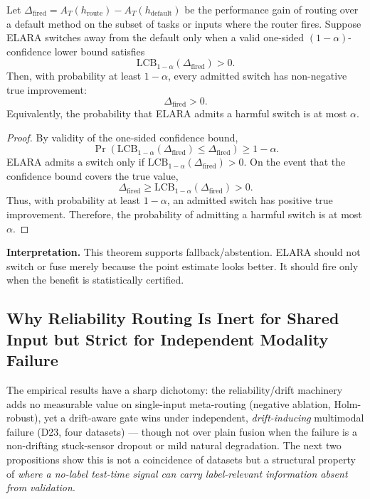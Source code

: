 \begin{theorem}
\label{thm:safe_switching}
Let $\Delta_{\mathrm{fired}} = A_T(h_{\mathrm{route}})-A_T(h_{\mathrm{default}})$ be the performance gain of routing over a default method on the subset of tasks or inputs where the router fires. Suppose ELARA switches away from the default only when a valid one-sided $(1-\alpha)$-confidence lower bound satisfies
\[
\mathrm{LCB}_{1-\alpha}(\Delta_{\mathrm{fired}})>0.
\]
Then, with probability at least $1-\alpha$, every admitted switch has non-negative true improvement:
\[
\Delta_{\mathrm{fired}}>0.
\]
Equivalently, the probability that ELARA admits a harmful switch is at most $\alpha$.
\end{theorem}
\begin{proof}
By validity of the one-sided confidence bound,
\[
\Pr\left(\mathrm{LCB}_{1-\alpha}(\Delta_{\mathrm{fired}})\leq \Delta_{\mathrm{fired}}\right)\geq 1-\alpha.
\]
ELARA admits a switch only if $\mathrm{LCB}_{1-\alpha}(\Delta_{\mathrm{fired}})>0$. On the event that the confidence bound covers the true value,
\[
\Delta_{\mathrm{fired}} \geq \mathrm{LCB}_{1-\alpha}(\Delta_{\mathrm{fired}}) > 0.
\]
Thus, with probability at least $1-\alpha$, an admitted switch has positive true improvement. Therefore, the probability of admitting a harmful switch is at most $\alpha$.
\end{proof}

\medskip
\noindent\textbf{Interpretation.}
This theorem supports fallback/abstention. ELARA should not switch or fuse merely because the point estimate looks better. It should fire only when the benefit is statistically certified.

\subsection{Why Reliability Routing Is Inert for Shared Input but Strict for Independent Modality Failure}
\label{sec:boundary-theory}

The empirical results have a sharp dichotomy: the reliability/drift machinery adds no
measurable value on single-input meta-routing (negative ablation, Holm-robust), yet a
drift-aware gate wins under independent, \emph{drift-inducing} multimodal failure (D23,
four datasets) --- though not over plain fusion when the failure is a non-drifting
stuck-sensor dropout or mild natural degradation. The next two propositions show this is
not a coincidence of datasets but a structural property of \emph{where a no-label
test-time signal can carry label-relevant information absent from validation}.

